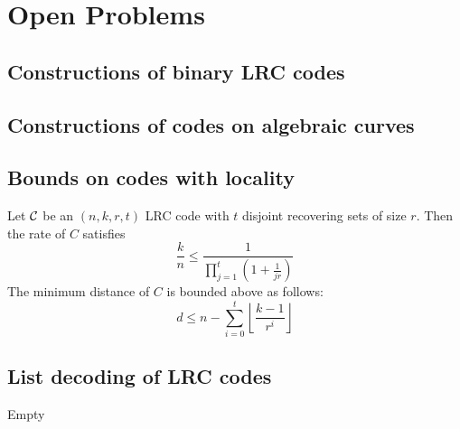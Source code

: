 \chapter{Open Problems}
\cite{MR_LRC}
\section{Constructions of binary LRC codes}
\cite{binary_constructions}

\section{Constructions of codes on algebraic curves}
\cite{LRC_on_alg_curves, LRC_on_alg_curves2, LRC_fibers}

\section{Bounds on codes with locality}
\cite{combinatorial_bounds}
\cite{bounds_on_LRC}
\cite{bounds_on_LRC_t}

\begin{thm}
Let ${\mathcal C}$ be an $(n,k,r,t)$ LRC code with $t$ disjoint recovering sets of size $r$. Then the rate of $C$ satisfies
\begin{equation}
\frac{k}{n} \leq \frac{1}{\prod_{j=1}^t(1+\frac{1}{jr})}
\end{equation}
The minimum distance of $C$ is bounded above as follows:
\begin{equation}
d \leq n - \sum_{i=0}^t \left\lfloor \frac{k-1}{r^i} \right\rfloor
\end{equation}
\end{thm}

\section{List decoding of LRC codes}
Empty